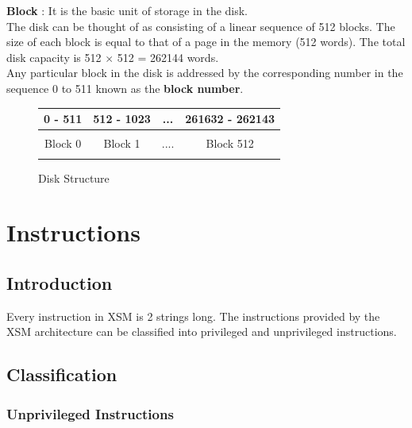 \documentclass[11pt]{article}
\begin{document}
\textbf{Block} : It is the basic unit of storage in the disk.\\

The disk can be thought of as consisting of a linear sequence of 512  blocks. The size of each block is equal to that of a page in the memory (512 words). The total disk capacity is 512 $\times$ 512 = 262144 words.\\

Any particular block in the disk is addressed by the corresponding number in the sequence 0 to 511 known as the \textbf{block number}.

\begin{figure}[htp!] \small
	\centering
	\begin{tabular}{|c|c|c|c|} 
	\hline
       0 - 511 & 512 - 1023 & ... &   261632 - 262143     \\
       \hline      
      & & & \\ 
      Block 0 & Block 1  & .... & Block 512 \\ 
      & & & \\       
       \hline
       
	\end{tabular}
	\caption{Disk Structure}
	\label{fig:mem_struct}
\end{figure}

 \section{Instructions}
\label{sec:inst}
\subsection{Introduction}

Every instruction in XSM is 2 strings long. The instructions provided by the XSM architecture can be classified into privileged and unprivileged instructions. 

\subsection{Classification}

\subsubsection{Unprivileged Instructions}
\end{document}
